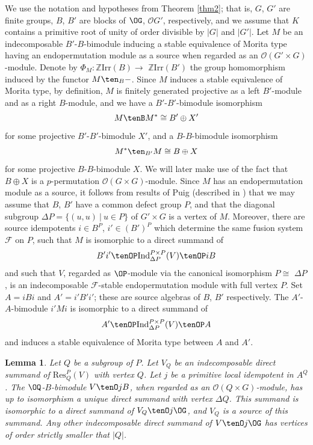 \documentclass{amsart} %
\theoremstyle{plain}\newtheorem{Theorem}{Theorem}[section]
\theoremstyle{plain}\newtheorem{Conjecture}[Theorem]{Conjecture}
\theoremstyle{plain}\newtheorem{Corollary}[Theorem]{Corollary}
\theoremstyle{plain}\newtheorem{Lemma}[Theorem]{Lemma}
\theoremstyle{plain}\newtheorem{Proposition}[Theorem]{Proposition}
\theoremstyle{definition}\newtheorem{Definition}[Theorem]{Definition}
\theoremstyle{definition}\newtheorem{Example}[Theorem]{Example}
\theoremstyle{definition}\newtheorem{Examples}[Theorem]{Examples}
\theoremstyle{definition}\newtheorem{Remark}[Theorem]{Remark}
\theoremstyle{definition}\newtheorem{Remarks}[Theorem]{Remarks}
\theoremstyle{plain}\newtheorem{Statement}[Theorem]{}
\def\CF{{\mathcal{F}}}    \def\OS{{\mathcal{O}S}}
\def\CO{{\mathcal{O}}}
\def\Z{{\mathbb Z}}
\def\Ind{\mathrm{Ind}}           \def\tenK{\otimes_K}
\def\Irr{\mathrm{Irr}}           \def\tenK{\otimes_K}
\def\Res{\mathrm{Res}}           \def\tenOR{\otimes_{\mathcal{O}R}}
\begin{document}
We use the notation and hypotheses from Theorem \ref{thm2}; that is,
$G$, $G'$ are finite groups, $B$, $B'$ are blocks of $\OG$, $\CO G'$,
respectively, and we assume that $K$ contains a primitive root of unity of 
order divisible by $|G|$ and $|G'|$.
Let $M$ be an indecomposable  $B'$-$B$-bimodule inducing a stable 
equivalence of Morita type having an endopermutation module as a source when
regarded as an $\CO(G'\times G)$-module. Denote by $\Phi_M : \Z\Irr(B)\to$
$\Z\Irr(B')$ the group homomorphism induced by the functor $M\ten_{B}-$.
Since $M$ induces a stable equivalence of Morita type, by definition,
$M$ is finitely generated projective as a left $B'$-module and as a right
$B$-module, and we have a $B'$-$B'$-bimodule isomorphism
$$M\tenB M^*\cong B'\oplus X'$$ 
for some projective $B'$-$B'$-bimodule $X'$, and a $B$-$B$-bimodule isomorphism
$$M^*\ten_{B'} M \cong B\oplus X$$
for some projective $B$-$B$-bimodule $X$. We will later make use of the fact that 
$B\oplus X$  is a $p$-permutation $\CO(G\times G)$-module.
Since $M$ has an endopermutation module
as a source, it follows from results of Puig \cite[7.6]{Puigbook} (described in 
\cite[Theorem 9.11.2]{LiBookII}) that we may assume that $B$, $B'$
have a common defect group $P$, and that the diagonal subgroup
$\Delta P=\{(u,u)\ | \ u\in P\}$ of $G'\times G$ is a vertex of $M$.
Moreover, there are source idempotents $i\in B^P$, $i'\in (B')^P$
which determine the same fusion system $\CF$ on $P$, 
such that $M$ is isomorphic to a direct summand of
$$B'i' \tenOP \Ind^{P\times P}_{\Delta P}(V) \tenOP iB$$
and such that $V$, regarded as $\OP$-module via the
canonical isomorphism $P\cong$ $\Delta P$, is  an indecomposable
$\CF$-stable endopermutation module with full vertex $P$.
Set $A=iBi$ and $A'=i'B'i'$; these are source algebras of $B$, $B'$ respectively.
The $A'$-$A$-bimodule  $i'Mi$ is isomorphic to a direct summand of
$$A' \tenOP \Ind^{P\times P}_{\Delta P}(V) \tenOP A$$
and induces a stable equivalence of Morita type between $A$ and $A'$.

\begin{Lemma} \label{lem6}
Let $Q$ be a subgroup of $P$. Let $V_Q$ be an indecomposable direct
summand of $\Res^P_Q(V)$ with vertex $Q$. Let $j$ be a primitive local
idempotent in $A^Q$. The $\OQ$-$B$-bimodule $V\tenO jB$, when
regarded as an $\CO(Q\times G)$-module, has
up to isomorphism a unique direct summand with vertex $\Delta Q$.  
This summand is isomorphic to a direct summand of $V_Q\tenO j\OG$, and
$V_Q$ is a source of this summand.  Any other indecomposable direct 
summand of $V\tenO j\OG$ has vertices  of order strictly smaller that $|Q|$.
\end{Lemma}
\end{document}
